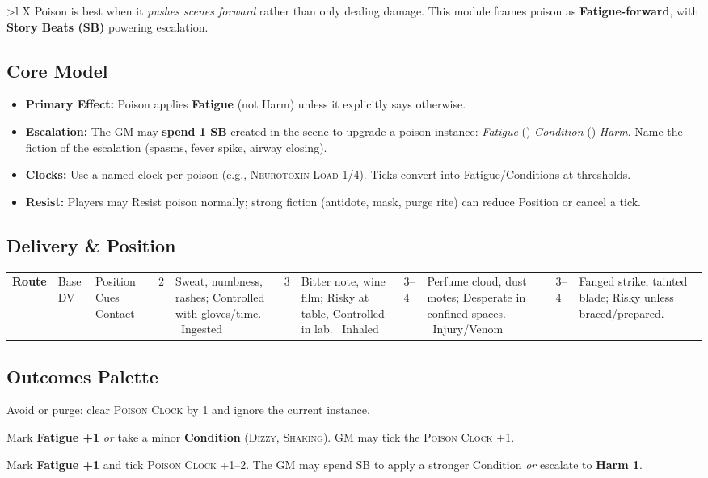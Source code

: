 \begin{tabularx}{\linewidth}{>{\bfseries}l X}
Poison is best when it \emph{pushes scenes forward} rather than only dealing damage. This module frames poison as \textbf{Fatigue-forward}, with \textbf{Story Beats (SB)} powering escalation.

\subsection*{Core Model}
\begin{itemize}
\item \textbf{Primary Effect:} Poison applies \textbf{Fatigue} (not Harm) unless it explicitly says otherwise.
\item \textbf{Escalation:} The GM may \textbf{spend 1 SB} created in the scene to upgrade a poison instance: \emph{Fatigue} (\to) \emph{Condition} (\to) \emph{Harm}. Name the fiction of the escalation (spasms, fever spike, airway closing).
\item \textbf{Clocks:} Use a named clock per poison (e.g., \textsc{Neurotoxin Load} 1/4). Ticks convert into Fatigue/Conditions at thresholds.
\item \textbf{Resist:} Players may Resist poison normally; strong fiction (antidote, mask, purge rite) can reduce Position or cancel a tick.
\end{itemize}

\subsection*{Delivery \& Position}
\begin{tabularx}{\linewidth}{>{\bfseries}l l X}
\toprule
Route & Base DV & Position Cues \
\midrule
Contact & 2 & Sweat, numbness, rashes; Controlled with gloves/time. \
Ingested & 3 & Bitter note, wine film; Risky at table, Controlled in lab. \
Inhaled & 3--4 & Perfume cloud, dust motes; Desperate in confined spaces. \
Injury/Venom & 3--4 & Fanged strike, tainted blade; Risky unless braced/prepared. \
\bottomrule
\end{tabularx}

\subsection*{Outcomes Palette}
\begin{description}[leftmargin=1.6em]
\item[\textbf{Strong Hit.}] Avoid or purge: clear \textsc{Poison Clock} by 1 and ignore the current instance.
\item[\textbf{Mixed.}] Mark \textbf{Fatigue +1} \emph{or} take a minor \textbf{Condition} (\textsc{Dizzy}, \textsc{Shaking}). GM may tick the \textsc{Poison Clock} +1.
\item[\textbf{Miss.}] Mark \textbf{Fatigue +1} and tick \textsc{Poison Clock} +1–2. The GM may spend SB to apply a stronger Condition \emph{or} escalate to \textbf{Harm 1}.
\end{description}


\end{tabularx}
